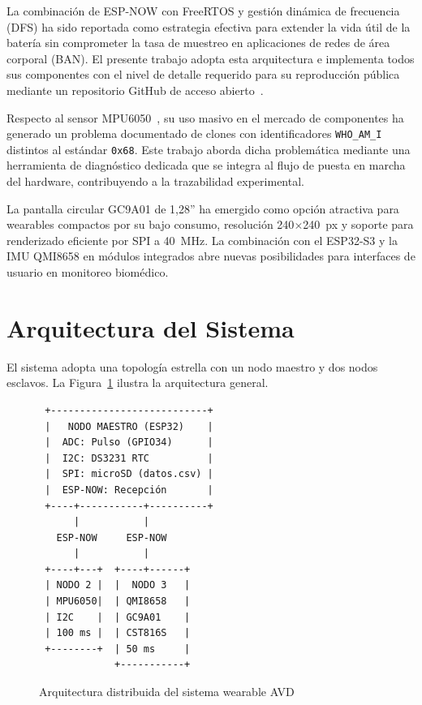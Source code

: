 \documentclass[10pt,twocolumn,a4paper]{article}
\begin{document}
La combinación de ESP-NOW con FreeRTOS y gestión dinámica de frecuencia
(DFS) ha sido reportada como estrategia efectiva para extender la vida
útil de la batería sin comprometer la tasa de muestreo en aplicaciones
de redes de área corporal (BAN). El presente trabajo adopta esta
arquitectura e implementa todos sus componentes con el nivel de detalle
requerido para su reproducción pública mediante un repositorio GitHub
de acceso abierto~\cite{repo_github}.

Respecto al sensor MPU6050~\cite{invensense2013}, su uso masivo en el
mercado de componentes ha generado un problema documentado de clones
con identificadores \texttt{WHO\_AM\_I} distintos al estándar
\texttt{0x68}. Este trabajo aborda dicha problemática mediante una
herramienta de diagnóstico dedicada que se integra al flujo de puesta
en marcha del hardware, contribuyendo a la trazabilidad experimental.

La pantalla circular GC9A01 de 1,28'' ha emergido como opción atractiva
para wearables compactos por su bajo consumo, resolución 240$\times$240~px
y soporte para renderizado eficiente por SPI a 40~MHz. La combinación
con el ESP32-S3 y la IMU QMI8658 en módulos integrados abre nuevas
posibilidades para interfaces de usuario en monitoreo biomédico.

\section{Arquitectura del Sistema}
\label{sec:arq}

El sistema adopta una topología estrella con un nodo maestro y dos
nodos esclavos. La Figura~\ref{fig:arq} ilustra la arquitectura
general.

\begin{figure}[H]
\centering
\scriptsize
\begin{verbatim}
 +---------------------------+
 |   NODO MAESTRO (ESP32)    |
 |  ADC: Pulso (GPIO34)      |
 |  I2C: DS3231 RTC          |
 |  SPI: microSD (datos.csv) |
 |  ESP-NOW: Recepción       |
 +----+-----------+----------+
      |           |
   ESP-NOW     ESP-NOW
      |           |
 +----+---+  +----+------+
 | NODO 2 |  |  NODO 3   |
 | MPU6050|  | QMI8658   |
 | I2C    |  | GC9A01    |
 | 100 ms |  | CST816S   |
 +--------+  | 50 ms     |
             +-----------+
\end{verbatim}
\caption{Arquitectura distribuida del sistema wearable AVD}
\label{fig:arq}
\end{figure}
\end{document}
